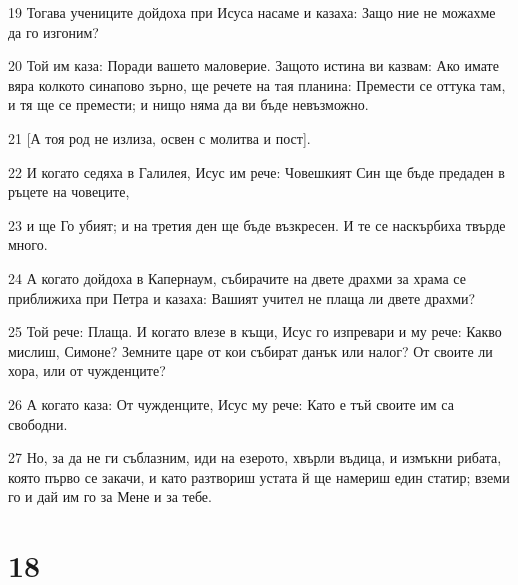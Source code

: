 \par 19 Тогава учениците дойдоха при Исуса насаме и казаха: Защо ние не можахме да го изгоним?
\par 20 Той им каза: Поради вашето маловерие. Защото истина ви казвам: Ако имате вяра колкото синапово зърно, ще речете на тая планина: Премести се оттука там, и тя ще се премести; и нищо няма да ви бъде невъзможно.
\par 21 [А тоя род не излиза, освен с молитва и пост].
\par 22 И когато седяха в Галилея, Исус им рече: Човешкият Син ще бъде предаден в ръцете на човеците,
\par 23 и ще Го убият; и на третия ден ще бъде възкресен. И те се наскърбиха твърде много.
\par 24 А когато дойдоха в Капернаум, събирачите на двете драхми за храма се приближиха при Петра и казаха: Вашият учител не плаща ли двете драхми?
\par 25 Той рече: Плаща. И когато влезе в къщи, Исус го изпревари и му рече: Какво мислиш, Симоне? Земните царе от кои събират данък или налог? От своите ли хора, или от чужденците?
\par 26 А когато каза: От чужденците, Исус му рече: Като е тъй своите им са свободни.
\par 27 Но, за да не ги съблазним, иди на езерото, хвърли въдица, и измъкни рибата, която първо се закачи, и като разтвориш устата й ще намериш един статир; вземи го и дай им го за Мене и за тебе.

\chapter{18}

